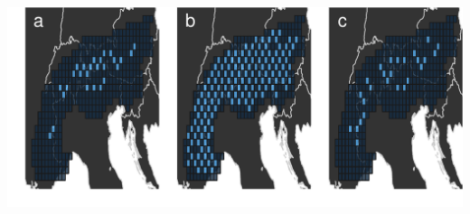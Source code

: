 \documentclass[11pt,]{article}
\let\origfigure\figure
\let\endorigfigure\endfigure
\renewenvironment{figure}[1][2] {
	\expandafter\origfigure\expandafter[H]
} {
	\endorigfigure
}
\begin{document}
\begin{figure}[htbp]
\centering
\includegraphics{article_files/figure-latex/unnamed-chunk-3-1.pdf}
\caption{Multi-species prioritisations. Panel (a) shows the
prioritisation generated for using just amount-based targets. Panel (b)
shows the prioritisation generated using amount-based and surrogate
based targets. Panel (c) shows the prioritisation generated using
amount-based and genetic-based targets}
\end{figure}
\end{document}
